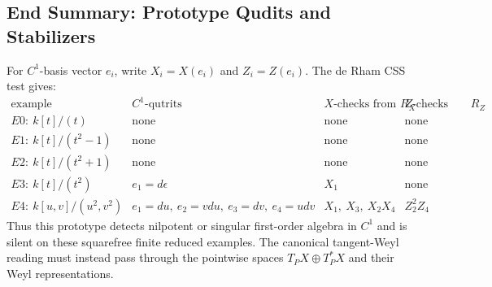 \subsection{End Summary: Prototype Qudits and Stabilizers}
For \(C^1\)-basis vector \(e_i\), write \(X_i=X(e_i)\) and
\(Z_i=Z(e_i)\).  The de Rham CSS test gives:
{\scriptsize
\[
\begin{array}{c|c|c|c}
\text{example} & C^1\text{-qutrits} & X\text{-checks from }R_X
  & Z\text{-checks from }R_Z\\ \hline
E0:\ k[t]/(t) & \text{none} & \text{none} & \text{none}\\
E1:\ k[t]/(t^2-1) & \text{none} & \text{none} & \text{none}\\
E2:\ k[t]/(t^2+1) & \text{none} & \text{none} & \text{none}\\
E3:\ k[t]/(t^2) & e_1=d\epsilon & X_1 & \text{none}\\
E4:\ k[u,v]/(u^2,v^2) &
  e_1=du,\ e_2=vdu,\ e_3=dv,\ e_4=udv &
  X_1,\ X_3,\ X_2X_4 &
  Z_2^2Z_4
\end{array}
\]
}
Thus this prototype detects nilpotent or singular first-order algebra in
\(C^1\) and is silent on these squarefree finite reduced examples.  The
canonical tangent-Weyl reading must instead pass through the pointwise spaces
\(T_PX\oplus T_P^*X\) and their Weyl representations.

